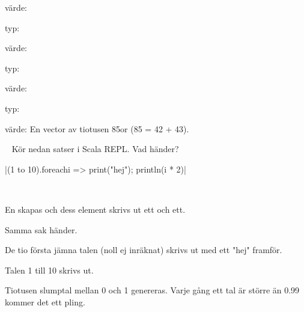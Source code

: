 värde: 

\SubtaskSolved  typ: 

värde: 

\SubtaskSolved  typ: 

värde: 

\SubtaskSolved  typ: 

värde: En vector av tiotusen 85or (85 = 42 + 43).



\QUESTEND









\QUESTBEGIN

\Task  \what~  Kör nedan satser i Scala REPL. Vad händer?

\Subtask {}

\Subtask {}

\Subtask \code|(1 to 10).foreach{i => print("hej"); println(i * 2)}|

\Subtask {}

\Subtask {}\\


\SOLUTION


\TaskSolved \what
 

\SubtaskSolved  En  skapas och dess element skrivs ut ett och ett.

\SubtaskSolved  Samma sak händer.

\SubtaskSolved  De tio första jämna talen (noll ej inräknat) skrivs ut med ett "hej" framför.

\SubtaskSolved  Talen 1 till 10 skrivs ut.

\SubtaskSolved  Tiotusen slumptal mellan 0 och 1 genereras. Varje gång ett tal är större än 0.99 kommer det ett pling.



\QUESTEND




